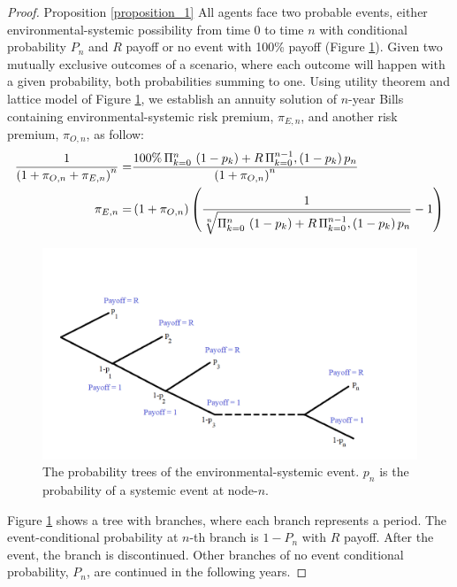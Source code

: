 \documentclass[sn-basic]{sn-jnl}%
\theoremstyle{thmstyleone}%
\theoremstyle{thmstyletwo}%
\theoremstyle{thmstylethree}%
\begin{document}
\begin{proof}{Proposition \ref{proposition_1}}
	All agents face two probable events, either environmental-systemic possibility from time $0$ to time $n$ with conditional probability $P_{n}$ and $R$ payoff or no event with 100\% payoff (Figure \ref{fig3a}). Given two mutually exclusive outcomes of a scenario, where each outcome will happen with a given probability, both probabilities summing to one. Using \citeauthor{von2007theory} utility theorem and lattice model of Figure \ref{fig3a}, we establish an annuity solution of $n$-year Bills containing environmental-systemic risk premium, $\pi_{E,n}$, and another risk premium, $\pi_{O,n}$, as follow:
	\begin{align}\label{env_systemic}
		\frac{1}{\left(1+\pi_{O,n}+\pi_{E,n}\right)^n }=& \frac{100\%\,\Pi_{k=0}^n\,\left(1-p_{k}\right)+R\, \Pi_{k=0}^{n-1},\left(1-p_{k}\right)p_{n}}{\left(1+\pi_{O,n}\right)^n}\notag\\
		\pi_{E,n}=&\left(1+\pi_{O,n}\right) \left(\frac{1}{\sqrt[n]{\Pi_{k=0}^n\,\left(1-p_{k}\right)+R\, \Pi_{k=0}^{n-1},\left(1-p_{k}\right)p_{n}}}-1\right)
	\end{align}
	\begin{figure}[h!]
	\centering
	\includegraphics[width=1.0\textwidth]{Fig3a}
	\caption{The probability trees of the environmental-systemic event. $p_n$ is the probability of a systemic event at node-$n$.}
	\label{fig3a}
	\end{figure}
	Figure \ref{fig3a} shows a tree with branches, where each branch represents a period. The event-conditional probability at $n$-th branch is $1-P_{n}$ with $R$ payoff. After the event, the branch is discontinued. Other branches of no event conditional probability, $P_{n}$, are continued in the following years.
	

\end{proof}
\end{document}
